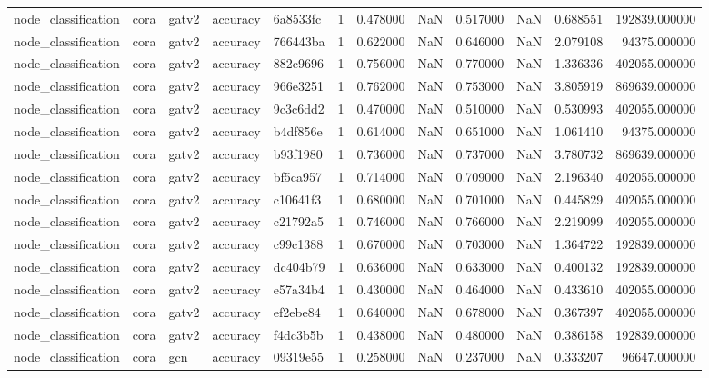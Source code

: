 \begin{tabular}{lllllrrrrrrr}
node_classification & cora & gatv2 & accuracy & 6a8533fc & 1 & 0.478000 & NaN & 0.517000 & NaN & 0.688551 & 192839.000000 \\
node_classification & cora & gatv2 & accuracy & 766443ba & 1 & 0.622000 & NaN & 0.646000 & NaN & 2.079108 & 94375.000000 \\
node_classification & cora & gatv2 & accuracy & 882c9696 & 1 & 0.756000 & NaN & 0.770000 & NaN & 1.336336 & 402055.000000 \\
node_classification & cora & gatv2 & accuracy & 966e3251 & 1 & 0.762000 & NaN & 0.753000 & NaN & 3.805919 & 869639.000000 \\
node_classification & cora & gatv2 & accuracy & 9c3c6dd2 & 1 & 0.470000 & NaN & 0.510000 & NaN & 0.530993 & 402055.000000 \\
node_classification & cora & gatv2 & accuracy & b4df856e & 1 & 0.614000 & NaN & 0.651000 & NaN & 1.061410 & 94375.000000 \\
node_classification & cora & gatv2 & accuracy & b93f1980 & 1 & 0.736000 & NaN & 0.737000 & NaN & 3.780732 & 869639.000000 \\
node_classification & cora & gatv2 & accuracy & bf5ca957 & 1 & 0.714000 & NaN & 0.709000 & NaN & 2.196340 & 402055.000000 \\
node_classification & cora & gatv2 & accuracy & c10641f3 & 1 & 0.680000 & NaN & 0.701000 & NaN & 0.445829 & 402055.000000 \\
node_classification & cora & gatv2 & accuracy & c21792a5 & 1 & 0.746000 & NaN & 0.766000 & NaN & 2.219099 & 402055.000000 \\
node_classification & cora & gatv2 & accuracy & c99c1388 & 1 & 0.670000 & NaN & 0.703000 & NaN & 1.364722 & 192839.000000 \\
node_classification & cora & gatv2 & accuracy & dc404b79 & 1 & 0.636000 & NaN & 0.633000 & NaN & 0.400132 & 192839.000000 \\
node_classification & cora & gatv2 & accuracy & e57a34b4 & 1 & 0.430000 & NaN & 0.464000 & NaN & 0.433610 & 402055.000000 \\
node_classification & cora & gatv2 & accuracy & ef2ebe84 & 1 & 0.640000 & NaN & 0.678000 & NaN & 0.367397 & 402055.000000 \\
node_classification & cora & gatv2 & accuracy & f4dc3b5b & 1 & 0.438000 & NaN & 0.480000 & NaN & 0.386158 & 192839.000000 \\
node_classification & cora & gcn & accuracy & 09319e55 & 1 & 0.258000 & NaN & 0.237000 & NaN & 0.333207 & 96647.000000 \\

\end{tabular}
